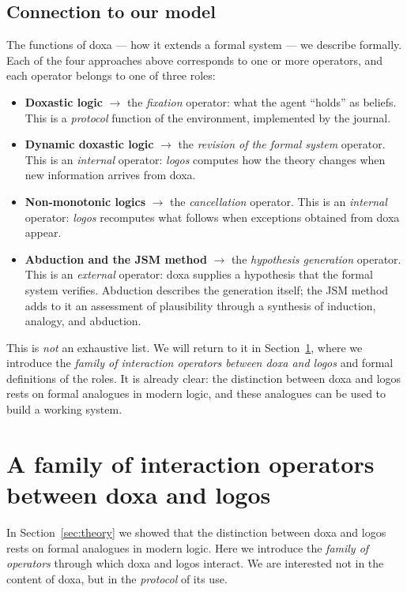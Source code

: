 \documentclass[12pt,a4paper]{article}
\begin{document}
\subsection{Connection to our model}
\label{sec:theory_model}

The functions of doxa --- how it extends a formal system --- we describe
formally. Each of the four approaches above corresponds to one or more
operators, and each operator belongs to one of three roles:

\begin{itemize}
	\item \textbf{Doxastic logic} $\to$ the \emph{fixation} operator: what
	      the agent ``holds'' as beliefs. This is a \emph{protocol} function
	      of the environment, implemented by the journal.
	\item \textbf{Dynamic doxastic logic} $\to$ the \emph{revision of the
	      formal system} operator. This is an \emph{internal} operator:
	      \emph{logos} computes how the theory changes when new information
	      arrives from doxa.
	\item \textbf{Non-monotonic logics} $\to$ the \emph{cancellation}
	      operator. This is an \emph{internal} operator: \emph{logos}
	      recomputes what follows when exceptions obtained from doxa appear.
	\item \textbf{Abduction and the JSM method} $\to$ the \emph{hypothesis
	      generation} operator. This is an \emph{external} operator: doxa
	      supplies a hypothesis that the formal system verifies. Abduction
	      describes the generation itself; the JSM method adds to it an
	      assessment of plausibility through a synthesis of induction,
	      analogy, and abduction.
\end{itemize}

This is \emph{not} an exhaustive list. We will return to it in
Section~\ref{sec:operators}, where we introduce the \emph{family of interaction
operators between doxa and logos} and formal definitions of the roles. It is
already clear: the distinction between doxa and logos rests on formal analogues
in modern logic, and these analogues can be used to build a working system.

\section{A family of interaction operators between doxa and logos}
\label{sec:operators}

In Section~\ref{sec:theory} we showed that the distinction between doxa and
logos rests on formal analogues in modern logic. Here we introduce the
\emph{family of operators} through which doxa and logos interact. We are
interested not in the content of doxa, but in the \emph{protocol} of its use.
\end{document}
